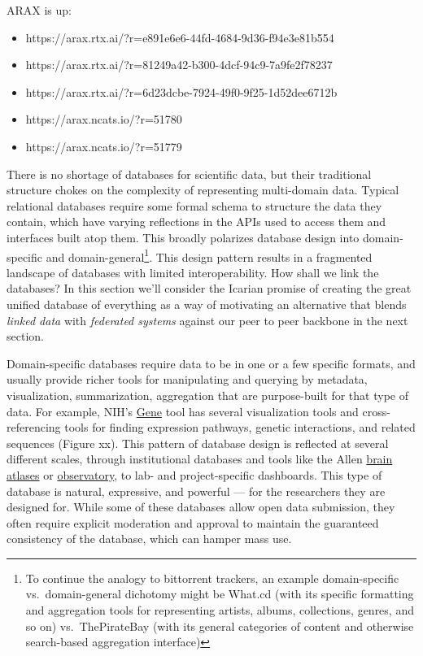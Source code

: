 ARAX is up:

\begin{itemize}
\tightlist
\item
  https://arax.rtx.ai/?r=e891e6e6-44fd-4684-9d36-f94e3e81b554
\item
  https://arax.rtx.ai/?r=81249a42-b300-4dcf-94c9-7a9fe2f78237
\item
  https://arax.rtx.ai/?r=6d23dcbe-7924-49f0-9f25-1d52dee6712b
\item
  https://arax.ncats.io/?r=51780
\item
  https://arax.ncats.io/?r=51779
\end{itemize}

There is no shortage of databases for scientific data, but their
traditional structure chokes on the complexity of representing
multi-domain data. Typical relational databases require some formal
schema to structure the data they contain, which have varying
reflections in the APIs used to access them and interfaces built atop
them. This broadly polarizes database design into domain-specific and
domain-general\footnote{To continue the analogy to bittorrent trackers,
  an example domain-specific vs.~domain-general dichotomy might be
  What.cd (with its specific formatting and aggregation tools for
  representing artists, albums, collections, genres, and so on)
  vs.~ThePirateBay (with its general categories of content and otherwise
  search-based aggregation interface)}. This design pattern results in a
fragmented landscape of databases with limited interoperability. How
shall we link the databases? In this section we'll consider the Icarian
promise of creating the great unified database of everything as a way of
motivating an alternative that blends \emph{linked data} \citep{berners-leeLinkedData2006}  with \emph{federated systems} against our
peer to peer backbone in the next section.

Domain-specific databases require data to be in one or a few specific
formats, and usually provide richer tools for manipulating and querying
by metadata, visualization, summarization, aggregation that are
purpose-built for that type of data. For example, NIH's
\href{https://www.ncbi.nlm.nih.gov/gene/12550}{Gene} tool has several
visualization tools and cross-referencing tools for finding expression
pathways, genetic interactions, and related sequences (Figure xx). This
pattern of database design is reflected at several different scales,
through institutional databases and tools like the Allen
\href{https://connectivity.brain-map.org/}{brain atlases} or
\href{http://observatory.brain-map.org/visualcoding/}{observatory}, to
lab- and project-specific dashboards. This type of database is natural,
expressive, and powerful --- for the researchers they are designed for.
While some of these databases allow open data submission, they often
require explicit moderation and approval to maintain the guaranteed
consistency of the database, which can hamper mass use.

